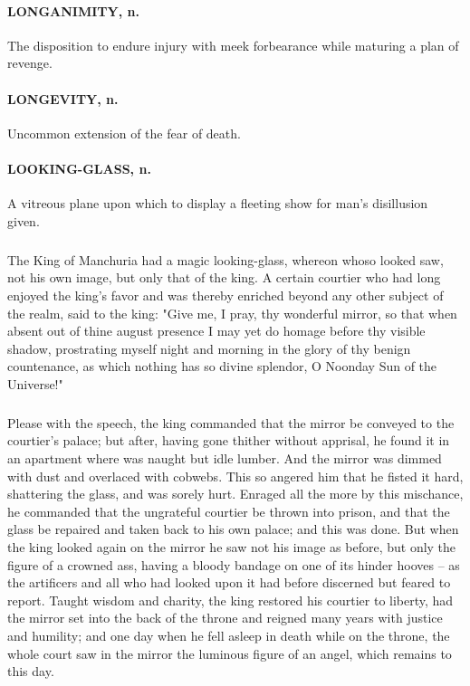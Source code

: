 \documentclass[11pt]{article}
\begin{document}
\paragraph{LONGANIMITY, n.}  The disposition to endure injury with meek forbearance
while maturing a plan of revenge.

\paragraph{LONGEVITY, n.}  Uncommon extension of the fear of death.

\paragraph{LOOKING-GLASS, n.}  A vitreous plane upon which to display a fleeting
show for man's disillusion given.
\subparagraph{}   The King of Manchuria had a magic looking-glass, whereon whoso
looked saw, not his own image, but only that of the king.  A certain
courtier who had long enjoyed the king's favor and was thereby
enriched beyond any other subject of the realm, said to the king:
"Give me, I pray, thy wonderful mirror, so that when absent out of
thine august presence I may yet do homage before thy visible shadow,
prostrating myself night and morning in the glory of thy benign
countenance, as which nothing has so divine splendor, O Noonday Sun of
the Universe!"
\subparagraph{}   Please with the speech, the king commanded that the mirror be
conveyed to the courtier's palace; but after, having gone thither
without apprisal, he found it in an apartment where was naught but
idle lumber.  And the mirror was dimmed with dust and overlaced with
cobwebs.  This so angered him that he fisted it hard, shattering the
glass, and was sorely hurt.  Enraged all the more by this mischance,
he commanded that the ungrateful courtier be thrown into prison, and
that the glass be repaired and taken back to his own palace; and this
was done.  But when the king looked again on the mirror he saw not his
image as before, but only the figure of a crowned ass, having a bloody
bandage on one of its hinder hooves -- as the artificers and all who
had looked upon it had before discerned but feared to report.  Taught
wisdom and charity, the king restored his courtier to liberty, had the
mirror set into the back of the throne and reigned many years with
justice and humility; and one day when he fell asleep in death while
on the throne, the whole court saw in the mirror the luminous figure
of an angel, which remains to this day.
\end{document}

